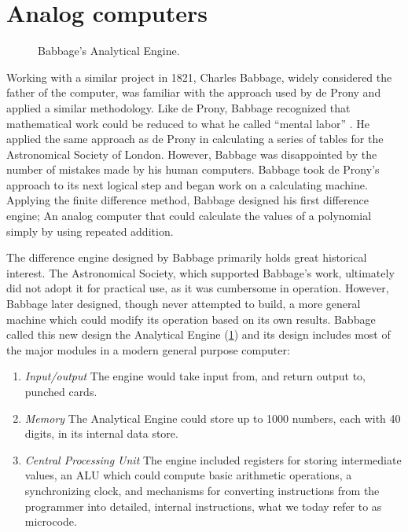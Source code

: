 \documentclass[\rootfolder/main.tex]{subfiles}
\begin{document}
\section{Analog computers}

\begin{figure}[ht]
  \caption{Babbage's Analytical Engine.\label{fig:engine}}
\end{figure}

Working with a similar project in 1821, Charles Babbage, widely considered the father of the computer, was familiar with the approach used by de Prony and applied a similar methodology.
Like de Prony, Babbage recognized that mathematical work could be reduced to what he called ``mental labor'' \cite{babbage1832}.
He applied the same approach as de Prony in calculating a series of tables for the Astronomical Society of London.
However, Babbage was disappointed by the number of mistakes made by his human computers.
Babbage took de Prony's approach to its next logical step and began work on a calculating machine.
Applying the finite difference method, Babbage designed his first difference engine; An analog computer that could calculate the values of a polynomial simply by using repeated addition.

The difference engine designed by Babbage primarily holds great historical interest.
The Astronomical Society, which supported Babbage's work, ultimately did not adopt it for practical use, as it was cumbersome in operation.
However, Babbage later designed, though never attempted to build, a more general machine which could modify its operation based on its own results.
Babbage called this new design the Analytical Engine (\cref{fig:engine}) and its design includes most of the major modules in a modern general purpose computer:

\begin{enumerate}
  \item \textit{Input/output} The engine would take input from, and return output to, punched cards.
  \item \textit{Memory} The Analytical Engine could store up to 1000 numbers, each with 40 digits, in its internal data store.
  \item \textit{Central Processing Unit} The engine included registers for storing intermediate values, an ALU which could compute basic arithmetic operations, a synchronizing clock,
      and mechanisms for converting instructions from the programmer into detailed, internal instructions, what we today refer to as microcode.
\end{enumerate}
\end{document}
